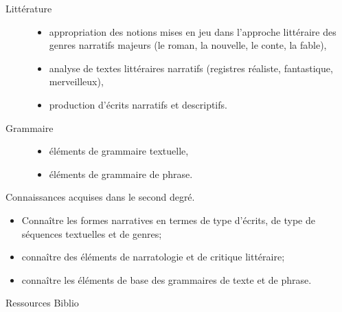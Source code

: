 \documentclass[10pt, a5paper]{report}
\begin{document}
{
\begin{description}
\item[Littérature]
\begin{itemize} 
\item appropriation des notions mises en jeu dans l'approche littéraire des genres narratifs majeurs (le roman, la nouvelle, le conte, la fable),
\item analyse de textes littéraires narratifs (registres réaliste, fantastique, merveilleux),
\item production d'écrits narratifs et descriptifs.
\end{itemize}
\item[Grammaire]
\begin{itemize} 
\item éléments de grammaire textuelle,
\item éléments de grammaire de phrase.
\end{itemize}
\end{description}
}
{Connaissances acquises dans le second degré.}
{
\begin{itemize}
\item Connaître les formes narratives en termes de type d'écrits, de type de séquences textuelles et de genres; 
\item connaître des éléments de narratologie et de critique littéraire;
\item connaître les éléments de base des grammaires de texte et de phrase.
\end{itemize}
}
{Ressources} 
{Biblio} 

\vfill

\end{document}
